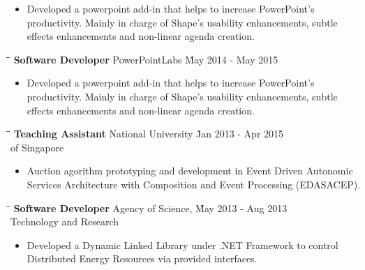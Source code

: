 \documentclass[9pt]{article}
\begin{document}
\begin{itemize}
    \item Developed a powerpoint add-in that helps to increase PowerPoint's productivity. Mainly in charge of Shape's usability enhancements, subtle effects enhancements and non-linear agenda creation.\vspace{-6pt}
\end{itemize}


\begin{tabbing}
\hspace{2.6in}\= \hspace{2.6in}\= \kill
{\bf Software Developer} \> PowerPointLabs \`May 2014 - May 2015\
\end{tabbing}

\begin{itemize}
    \item Developed a powerpoint add-in that helps to increase PowerPoint's productivity. Mainly in charge of Shape's usability enhancements, subtle effects enhancements and non-linear agenda creation.\vspace{-6pt}
\end{itemize}

\begin{tabbing}
\hspace{2.6in}\= \hspace{2.6in}\= \kill
{\bf Teaching Assistant} \> National University \`Jan 2013 - Apr 2015\\
             \> of Singapore
\end{tabbing}

\begin{itemize}
    \item Auction agorithm prototyping and development in Event Driven Autonomic Services Architecture with Composition and Event Processing (EDASACEP).
\end{itemize}

\begin{tabbing}
\hspace{2.6in} \= \hspace{2.6in}\= \kill
{\bf Software Developer} \> Agency of Science,  \`May 2013 - Aug 2013\\
             \> Technology and Research
\end{tabbing}

\begin{itemize}
  \item Developed a Dynamic Linked Library under .NET Framework to control Distributed Energy Resources via provided interfaces.
\end{itemize}
\end{document}

